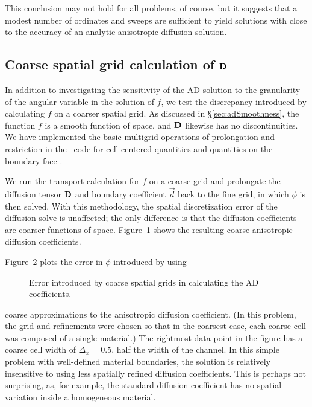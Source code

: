 This conclusion may not hold for all problems, of course, but it suggests that
a modest number of ordinates and sweeps are sufficient to yield solutions with
close to the accuracy of an analytic anisotropic diffusion solution.

\subsection{Coarse spatial grid calculation of \texorpdfstring{$\mathbf{D}$}{D}}
\label{sec:coarseGridAdCoeff}

In addition to investigating the sensitivity of the AD solution to the
granularity of
the angular variable in the solution of $f$, we test the discrepancy
introduced by calculating $f$ on a coarser spatial grid. As discussed in
\S\ref{sec:adSmoothness}, the function $f$ is a smooth function of space, and
$\mathbf{D}$ likewise has no discontinuities. We have implemented the basic
multigrid operations of prolongation and restriction in the \pytrt\ code
for cell-centered quantities and quantities on the boundary face \cite{Pytrt}.

We run the transport calculation for $f$ on a coarse grid and prolongate the
diffusion tensor $\mathbf{D}$ and boundary coefficient $\vec{d}$ back to the fine
grid, in which $\phi$
is then solved. With this methodology, the spatial discretization error of the
diffusion solve is unaffected; the only difference is that the diffusion
coefficients are coarser functions of space. Figure~\ref{fig:ssSingleMgD} shows
the resulting coarse anisotropic diffusion coefficients.

\begin{figure}[htb]
  \centering
{}%
%
  \label{fig:ssSingleMgD}
\end{figure}

Figure~\ref{fig:ssSingleMgConv} plots the error in $\phi$ introduced by using
%
\begin{figure}[htb]
  \centering
  
  \caption{Error introduced by coarse spatial grids in calculating the AD
  coefficients.}
  \label{fig:ssSingleMgConv}
\end{figure}
%
coarse approximations to the anisotropic diffusion coefficient. (In this
problem, the grid and refinements were chosen so that in the coarsest case, each
coarse cell was composed of a single material.) 
The rightmost data point in the figure has a coarse cell width of
$\Delta_x=0.5$, half the width of the channel.
In this simple problem with well-defined material boundaries, the
solution is relatively insensitive to using less spatially refined diffusion
coefficients. This is perhaps not surprising, as, for example, the standard
diffusion coefficient has no spatial variation inside a homogeneous material.

